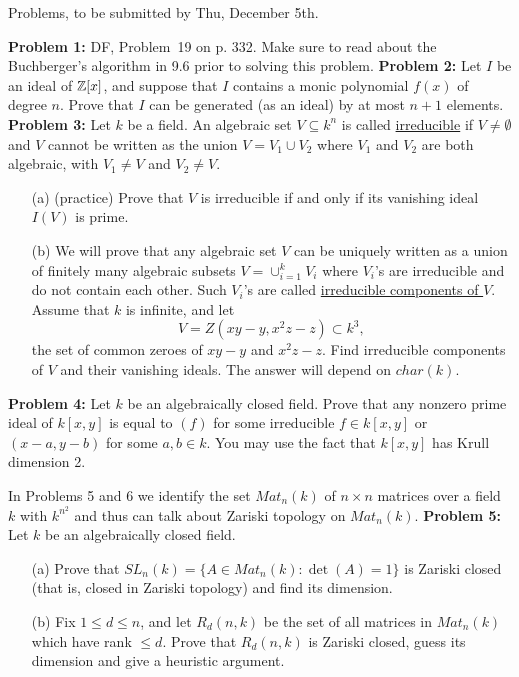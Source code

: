 \documentclass[12pt]{article}
\begin{document}
\skv
\skv
\bf\centerline{Problems, to be submitted by Thu, December 5th. }\rm
\skv
{\bf Problem 1:} DF, Problem~19 on p. 332. Make sure to read about the Buchberger's algorithm in 9.6 prior to solving this problem.
\skv
{\bf Problem 2:} Let $I$ be an ideal of ${\mathbb Z}[x]$, and suppose that $I$ contains a monic polynomial $f(x)$ of degree $n$. Prove that
$I$ can be generated (as an ideal) by at most $n+1$ elements. 
\skv
{\bf Problem 3:} Let $k$ be a field.
An algebraic set $V\subseteq k^n$ is called \underline{irreducible} 
if $V\neq\emptyset$ and $V$ cannot be written as the union $V=V_1\cup V_2$ where
$V_1$ and $V_2$ are both algebraic, with $V_1\neq V$ and $V_2\neq V$.
\begin{itemize}
\item[(a)] (practice) Prove that $V$ is irreducible if and only if its vanishing ideal
$I(V)$ is prime.  
\item[(b)] We will prove that any algebraic set $V$
can be uniquely written as a union of finitely many algebraic subsets 
$V=\cup_{i=1}^k V_i$ where $V_i$'s are irreducible and do not contain
each other. Such $V_i$'s are called \underline{irreducible components of $V$}.
Assume that $k$ is infinite, and 
let $$V=Z(xy-y, x^2z-z)\subset k^3,$$ the set of common zeroes of $xy-y$
and $x^2z-z$. Find irreducible components of $V$ and their vanishing ideals.
The answer will depend on $char(k)$.
\end{itemize}
\skv
{\bf Problem 4:} Let $k$ be an algebraically closed field. Prove that any
nonzero prime ideal  of $k[x,y]$ is equal to $(f)$ for some irreducible $f\in k[x,y]$
or $(x-a,y-b)$ for some $a,b\in k$. You may use the fact that $k[x,y]$ has Krull dimension 2.
\skv
\skv 
 
In Problems 5 and 6 we identify the set $Mat_n(k)$ of $n\times n$ matrices over a field $k$
with $k^{n^2}$ and thus can talk about Zariski topology on $Mat_n(k)$.
\skv
{\bf Problem 5:} Let $k$ be an algebraically closed field.
\begin{itemize}
\item[(a)] Prove that $SL_n(k)=\{A\in Mat_n(k): \det(A)=1\}$ is Zariski closed
(that is, closed in Zariski topology) and find its dimension.

\item[(b)] Fix $1\leq d\leq n$, and let $R_d(n,k)$  be the set of all matrices in $Mat_n(k)$
which have rank $\leq d$. Prove that $R_d(n,k)$ is Zariski closed, guess its dimension and
give a heuristic argument.
\end{itemize}
\end{document}
